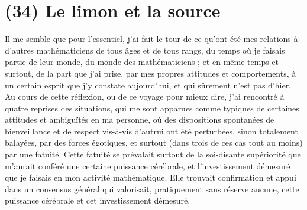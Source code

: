 \section{(34) Le limon et la source}

Il me semble que pour l'essentiel, j'ai fait le tour de ce qu'ont été mes relations à d'autres mathématiciens de tous âges et de tous rangs, du temps où je faisais partie de leur monde, du monde des mathématiciens ; et en même temps et surtout, de la part que j'ai prise, par mes propres attitudes et comportements, à un certain esprit que j'y constate aujourd'hui, et qui sûrement n'est pas d'hier. Au cours de cette réflexion, ou de ce voyage pour mieux dire, j'ai rencontré à quatre reprises des situations, qui me sont apparues comme typiques de certaines attitudes et ambiguïtés en ma personne, où des dispositions spontanées de bienveillance et de respect vis-à-vis d'autrui ont été perturbées, sinon totalement balayées, par des forces égotiques, et surtout (dans trois de ces cas tout au moins) par une fatuité. Cette fatuité se prévalait surtout de la soi-disante supériorité que m'aurait conféré une certaine puissance cérébrale, et l'investissement démesuré que je faisais en mon activité mathématique. Elle trouvait confirmation et appui dans un consensus général qui valorisait, pratiquement sans réserve aucune, cette puissance cérébrale et cet investissement démesuré.

